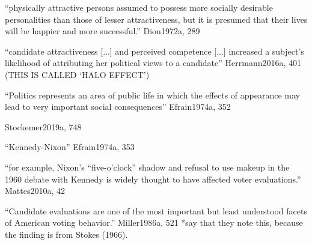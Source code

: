 

``physically attractive persons assumed to possess more socially desirable personalities than those of lesser attractiveness, but it is presumed that their lives will be happier and more successful.'' Dion1972a, 289

``candidate attractiveness [...] and perceived competence [...] increased a subject's likelihood of attributing her political views to a candidate'' Herrmann2016a, 401 (THIS IS CALLED `HALO EFFECT')


``Politics represents an area of public life in which the effects of appearance may lead to very important social consequences'' Efrain1974a, 352





		Stockemer2019a, 748

		``Kennedy-Nixon'' Efrain1974a, 353

		``for example, Nixon’s “five-o’clock” shadow and refusal to use makeup in the 1960 debate with Kennedy is widely thought to have affected voter evaluations.'' Mattes2010a, 42






		``Candidate evaluations are one of the most important but least understood facets of American voting behavior.'' Miller1986a, 521 *say that they note this, because the finding is from Stokes (1966).


